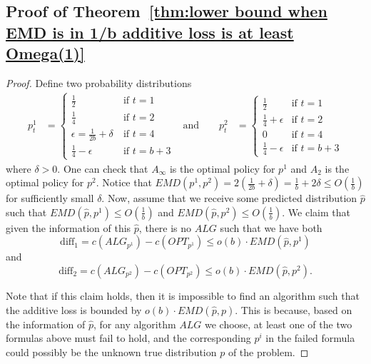 \subsection*{Proof of Theorem~\ref{thm:lower bound when EMD is in 1/b additive loss is at least Omega(1)}}
\label{appendix:proof_lowerbound_2}
\begin{proof}
Define two probability distributions
    \begin{align*}
    p^1_t &= 
    \begin{cases} 
      \frac{1}{2} & \ \text{if } t = 1 \\
      \frac{1}{4} & \ \text{if } t = 2 \\
      \epsilon = \frac{1}{2b} + \delta & \ \text{if } t = 4 \\
      \frac{1}{4} - \epsilon & \ \text{if } t = b + 3
    \end{cases} 
    &  \text{and} \qquad
    p^2_t &= 
    \begin{cases} 
      \frac{1}{2} & \text{if } t = 1 \\
      \frac{1}{4} + \epsilon & \text{if } t = 2 \\
      0 & \text{if } t = 4 \\
      \frac{1}{4} - \epsilon & \text{if } t = b + 3
    \end{cases}
    \end{align*}
where $\delta>0$. One can check that $A_\infty$ is the optimal policy for $p^1$ and $A_2$ is the optimal policy for $p^2$. Notice that $EMD(p^1,p^2) = 2(\frac{1}{2b}+\delta)=\frac{1}{b}+2\delta \leq O(\frac{1}{b})$ for sufficiently small $\delta$. Now, assume that we receive some predicted distribution $\hat{p}$ such that $EMD(\hat{p},p^1) \leq O(\frac{1}{b})$ and $EMD(\hat{p},p^2) \leq O(\frac{1}{b})$. We claim that given the information of this $\hat{p}$, there is no $ALG$ such that we have both
\[\text{diff}_1 = c(ALG_{p^1}) - c(OPT_{p^1}) \leq o(b) \cdot EMD(\hat{p},p^1)\]
and
\[\text{diff}_2 = c(ALG_{p^2}) - c(OPT_{p^2}) \leq o(b) \cdot EMD(\hat{p},p^2).\]

Note that if this claim holds, then it is impossible to find an algorithm such that the additive loss is bounded by $o(b) \cdot EMD(\hat{p},p)$. This is because, based on the information of $\hat{p}$, for any algorithm $ALG$ we choose, at least one of the two formulas above must fail to hold, and the corresponding $p^i$ in the failed formula could possibly be the unknown true distribution $p$ of the problem.


\end{proof}
